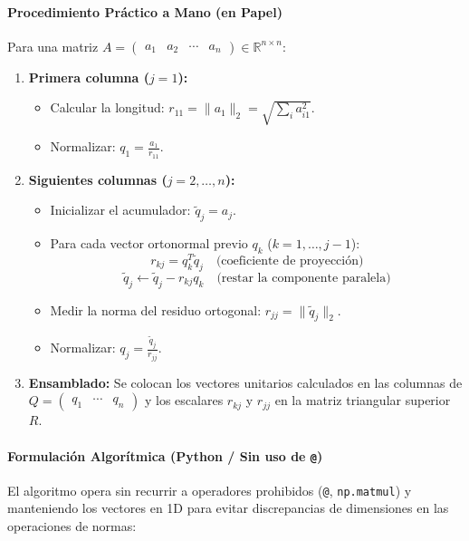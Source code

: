 \documentclass[11pt,a4paper]{article}
\begin{document}
\paragraph{Procedimiento Práctico a Mano (en Papel)}
Para una matriz $A = \begin{pmatrix} a_1 & a_2 & \cdots & a_n \end{pmatrix} \in \mathbb{R}^{n \times n}$:
\begin{enumerate}
    \item \textbf{Primera columna ($j = 1$):}
    \begin{itemize}
        \item Calcular la longitud: $r_{11} = \|a_1\|_2 = \sqrt{\sum_i a_{i1}^2}$.
        \item Normalizar: $q_1 = \frac{a_1}{r_{11}}$.
    \end{itemize}
    
    \item \textbf{Siguientes columnas ($j = 2, \dots, n$):}
    \begin{itemize}
        \item Inicializar el acumulador: $\tilde{q}_j = a_j$.
        \item Para cada vector ortonormal previo $q_k$ ($k = 1, \dots, j - 1$):
        \[
        r_{kj} = q_k^T \tilde{q}_j \quad \text{(coeficiente de proyección)}
        \]
        \[
        \tilde{q}_j \leftarrow \tilde{q}_j - r_{kj} q_k \quad \text{(restar la componente paralela)}
        \]
        \item Medir la norma del residuo ortogonal: $r_{jj} = \|\tilde{q}_j\|_2$.
        \item Normalizar: $q_j = \frac{\tilde{q}_j}{r_{jj}}$.
    \end{itemize}
    
    \item \textbf{Ensamblado:} Se colocan los vectores unitarios calculados en las columnas de $Q = \begin{pmatrix} q_1 & \cdots & q_n \end{pmatrix}$ y los escalares $r_{kj}$ y $r_{jj}$ en la matriz triangular superior $R$.
\end{enumerate}

\paragraph{Formulación Algorítmica (Python / Sin uso de \texttt{@})}
El algoritmo opera sin recurrir a operadores prohibidos (\texttt{@}, \texttt{np.matmul}) y manteniendo los vectores en 1D para evitar discrepancias de dimensiones en las operaciones de normas:
\end{document}
